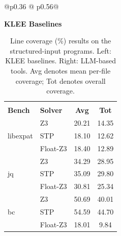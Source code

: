 \documentclass[acmsmall]{acmart}
\newcommand{\projName}{\textsc{Gordian}\xspace}
\theoremstyle{definition}
\begin{document}

\begin{table}[ht!]
\centering
\caption{Line coverage (\%) results on the structured-input programs.
Left: KLEE baselines.
Right: LLM-based tools.
Avg denotes mean per-file coverage; Tot denotes overall coverage.}
\label{tab:coverage-summary}
\footnotesize
\vspace{-4mm}
\hspace*{-8mm}\begin{tabular}{@{}p{}
@{\hspace{0.00\columnwidth}}
p{}@{}}

\raggedright
\centering\textbf{KLEE Baselines}\par\vspace{2pt}
\centering
\begin{tabular}{|l|lcc|}
\toprule
\multicolumn{4}{|c|}{\rule{0pt}{3.2ex}} \\  %
\textbf{Bench} & \textbf{Solver} & \textbf{Avg} & \textbf{Tot} \\
\midrule
\multirow{3}{*}{libexpat}
 & Z3        & 20.21 & 14.35 \\
 & STP       & 18.10 & 12.62 \\
 & Float-Z3  & 18.40 & 12.89 \\
\midrule
\multirow{3}{*}{jq}
 & Z3        & 34.29 & 28.95 \\
 & STP       & 35.09 & 29.80 \\
 & Float-Z3  & 30.81 & 25.34 \\
\midrule
\multirow{3}{*}{bc}
 & Z3        & 50.69 & 40.01 \\
 & STP       & 54.59 & 44.70 \\
 & Float-Z3  & 18.01 & 9.84 \\
  
 \midrule


\end{tabular}
\end{tabular}
\end{table}
\end{document}
